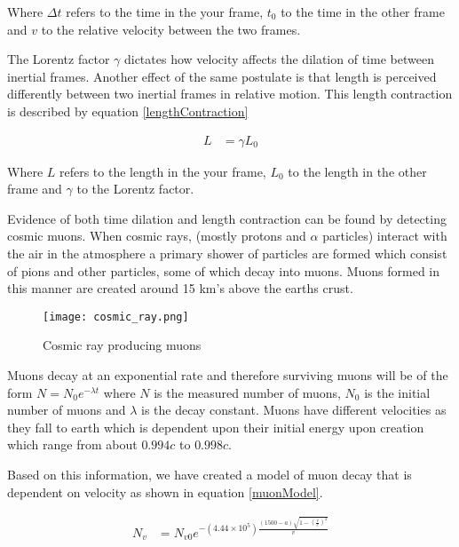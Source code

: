 \documentclass[oneside]{article}
\begin{document}
  \begin{center}
  Where $\Delta t$ refers to the time in the your frame, $t_0$ to the time in the other frame and $v$ to the relative velocity between the two frames.
  \end{center}

  The Lorentz factor $\gamma$ dictates how velocity affects the dilation of time between inertial frames. Another effect of the same postulate is that length is perceived differently between two inertial frames in relative motion. This length contraction is described by equation \ref{lengthContraction}

  \begin{align}\label{lengthContraction}
    L &= \gamma L_0
  \end{align}

  \begin{center}
  Where $L$ refers to the length in the your frame, $L_0$ to the length in the other frame and $\gamma$ to the Lorentz factor.
  \end{center}

  Evidence of both time dilation and length contraction can be found by detecting cosmic muons. When cosmic rays, (mostly protons and $\alpha$ particles) interact with the air in the atmosphere a primary shower of particles are formed which consist of pions and other particles, some of which decay into muons. Muons formed in this manner are created around 15 km's above the earths crust.

  \begin{figure}[H]
      \centering
      \texttt{[image: cosmic\_ray.png]}
      \caption{Cosmic ray producing muons}
      \label{cosmicMuonProduction}
  \end{figure}

  Muons decay at an exponential rate and therefore surviving muons will be of the form $N=N_0e^{-\lambda t}$ where $N$ is the measured number of muons, $N_0$ is the initial number of muons and $\lambda$ is the decay constant. Muons have different velocities as they fall to earth which is dependent upon their initial energy upon creation which range from about $0.994c$ to $0.998c$.

  Based on this information, we have created a model of muon decay that is dependent on velocity as shown in equation \ref{muonModel}.

  \begin{align}
    N_v&=N_{v0}e^{-(4.44\times10^5)\frac{(1500-a)\sqrt{1-(\frac{v}{c})^2}}{v}}
    \label{muonModel}
  \end{align}
\end{document}
